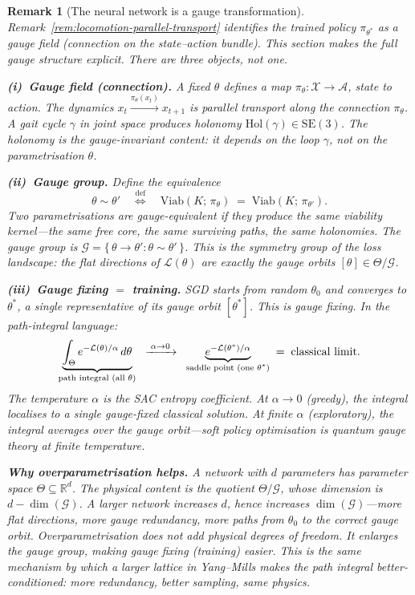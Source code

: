 \documentclass[11pt,a4paper]{article}
\newtheorem{remark}[theorem]{Remark}
\newcommand{\R}{\mathbb{R}}
\newcommand{\cL}{\mathcal{L}}
\newcommand{\cG}{\mathcal{G}}
\newcommand{\cA}{\mathcal{A}}
\newcommand{\cX}{\mathcal{X}}
\begin{document}
\begin{remark}[The neural network is a gauge transformation]%
\label{rem:nn-gauge}
\color{black!60}%
Remark~\ref{rem:locomotion-parallel-transport} identifies
the trained policy $\pi_{\theta^*}$ as a gauge field
(connection on the state--action bundle).
This section makes the full gauge structure explicit.
There are three objects, not one.

\medskip\noindent
\textbf{(i)\ Gauge field (connection).}\;
A fixed $\theta$ defines a map
$\pi_\theta \colon \cX \to \cA$,
state to action.
The dynamics
$x_t \xrightarrow{\pi_\theta(x_t)} x_{t+1}$
is \emph{parallel transport} along the connection $\pi_\theta$.
A gait cycle $\gamma$ in joint space produces
holonomy $\mathrm{Hol}(\gamma) \in \mathrm{SE}(3)$.
The holonomy is the gauge-invariant content:
it depends on the loop $\gamma$,
not on the parametrisation $\theta$.

\medskip\noindent
\textbf{(ii)\ Gauge group.}\;
Define the equivalence
\begin{equation}\label{eq:gauge-equiv}
  \theta \sim \theta'
  \quad\stackrel{\mathrm{def}}{\Longleftrightarrow}\quad
  \mathrm{Viab}(K;\, \pi_\theta)
  \;=\;
  \mathrm{Viab}(K;\, \pi_{\theta'}).
\end{equation}
Two parametrisations are \emph{gauge-equivalent}
if they produce the same viability kernel---the
same free core, the same surviving paths,
the same holonomies.
The gauge group is
$\cG = \{\,\theta \to \theta' : \theta \sim \theta'\,\}$.
This is the symmetry group of the loss landscape:
the flat directions of $\cL(\theta)$ are exactly
the gauge orbits $[\theta] \in \Theta / \cG$.

\medskip\noindent
\textbf{(iii)\ Gauge fixing $=$ training.}\;
SGD starts from random $\theta_0$ and converges to
$\theta^*$, a single representative of its
gauge orbit $[\theta^*]$.
This is gauge fixing.
In the path-integral language:
\[
  \underbrace{%
    \int_\Theta e^{-\cL(\theta)/\alpha}\,d\theta
  }_{\text{path integral (all $\theta$)}}
  \;\;\xrightarrow{\;\alpha \to 0\;}\;\;
  \underbrace{%
    e^{-\cL(\theta^*)/\alpha}
  }_{\text{saddle point (one $\theta^*$)}}
  \;=\;
  \text{classical limit.}
\]
The temperature $\alpha$ is the SAC entropy coefficient.
At $\alpha \to 0$ (greedy), the integral localises
to a single gauge-fixed classical solution.
At finite $\alpha$ (exploratory), the integral
averages over the gauge orbit---soft policy
optimisation \emph{is} quantum gauge theory
at finite temperature.

\medskip\noindent
\textbf{Why overparametrisation helps.}\;
A network with $d$ parameters has parameter space
$\Theta \subseteq \R^d$.
The physical content is the quotient
$\Theta / \cG$, whose dimension is
$d - \dim(\cG)$.
A larger network increases $d$, hence increases
$\dim(\cG)$---more flat directions, more gauge
redundancy, more paths from $\theta_0$ to the
correct gauge orbit.
Overparametrisation does not add physical degrees
of freedom.
It enlarges the gauge group, making
gauge fixing (training) easier.
This is the same mechanism by which
a larger lattice in Yang--Mills
makes the path integral better-conditioned:
more redundancy, better sampling, same physics.


\end{remark}
\end{document}

